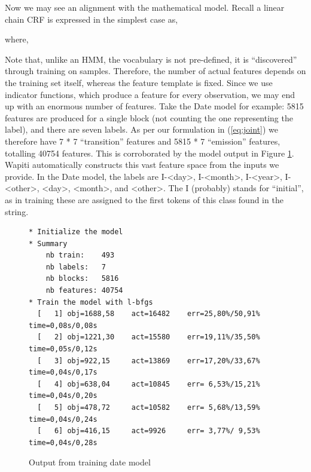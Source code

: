Now we may see an alignment with the mathematical model. Recall a linear chain CRF is expressed in the simplest case as,

where, 

Note that, unlike an HMM, the vocabulary is not pre-defined, it is ``discovered'' through training on samples. Therefore, the number of actual features depends on the training set itself, whereas the feature template is fixed. Since we use indicator functions, which produce a feature for every observation, we may end up with an enormous number of features. Take the Date model for example: 5815 features are produced for a single block (not counting the one representing the label), and there are seven labels. As per our formulation in (\ref{eq:joint}) we therefore have 7 * 7 ``transition'' features and 5815 * 7 ``emission'' features, totalling 40754 features. This is corroborated by the model output in Figure \ref{fig:output}. Wapiti automatically constructs this vast feature space from the inputs we provide. In the Date model, the labels are I-<day>, I-<month>, I-<year>, I-<other>, <day>, <month>, and <other>. The I (probably) stands for ``initial'', as in training these are assigned to the first tokens of this class found in the string.

\begin{figure}
\begin{verbatim}
* Initialize the model
* Summary
    nb train:    493
    nb labels:   7
    nb blocks:   5816
    nb features: 40754
* Train the model with l-bfgs
  [   1] obj=1688,58    act=16482    err=25,80%/50,91% time=0,08s/0,08s
  [   2] obj=1221,30    act=15580    err=19,11%/35,50% time=0,05s/0,12s
  [   3] obj=922,15     act=13869    err=17,20%/33,67% time=0,04s/0,17s
  [   4] obj=638,04     act=10845    err= 6,53%/15,21% time=0,04s/0,20s
  [   5] obj=478,72     act=10582    err= 5,68%/13,59% time=0,04s/0,24s
  [   6] obj=416,15     act=9926     err= 3,77%/ 9,53% time=0,04s/0,28s
\end{verbatim}
\caption{Output from training date model}
\label{fig:output}
\end{figure}

